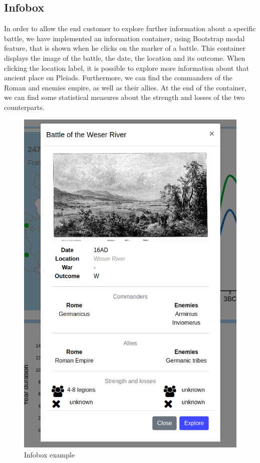 \subsection{Infobox}
In order to allow the end customer to explore further information about a specific battle, we have implemented an information container, using Bootstrap modal feature, that is shown when he clicks on the marker of a battle.
This container displays the image of the battle, the date, the location and its outcome.
When clicking the location label, it is possible to explore more information about that ancient place on Pleiads.
Furthermore, we can find the commanders of the Roman and enemies empire, as well as their allies.
At the end of the container, we can find some statistical measures about the strength and losses of the two counterparts.
\begin{figure}[h]
    \centering
    \includegraphics[scale=0.20]{./images/infobox.png}
    \caption{Infobox example}
\end{figure}

